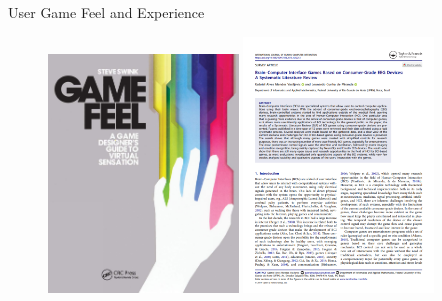 \begin{frame}{User Game Feel and Experience}
\begin{figure}
    \includegraphics[width=0.45\textwidth]{figures/literature/gamefeel/GameFeel_book}
    \includegraphics[width=0.45\textwidth]{figures/literature/gamefeel/BCI_Game_paper}
\end{figure}
\end{frame}


